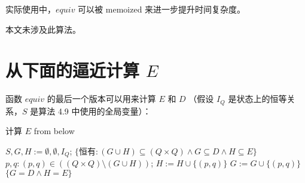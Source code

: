 实际使用中，$equiv$ 可以被 memoized 来进一步提升时间复杂度。

本文未涉及此算法。


\section{从下面的逼近计算 $E$ }

函数 $equiv$ 的最后一个版本可以用来计算 $E$ 和 $D$ （假设 $I_Q $ 是状态上的恒等关系，$S$ 是算法 4.9 中使用的全局变量）：

\begin{algorithm}
    \caption{计算 $E$ from below }\label{al:4-10}
    \small
    \begin{algorithmic}[1]
        \State $S,G,H:=\emptyset,\emptyset,I_Q$;
        \State $\{\mbox{{恒有}}: (G\cup H) \subseteq (Q \times Q) \land G \subseteq D \land H \subseteq E \}$
             $p,q : (p,q) \in ( ( Q\times Q) \setminus ( G \cup H) )$;
                $H:=H \cup \{ (p,q) \}$
                $G:=G \cup \{ (p,q) \}$
            \EndIf
        \Until  $ \{ G=D \land H = E \} $
    \end{algorithmic}
\end{algorithm}

